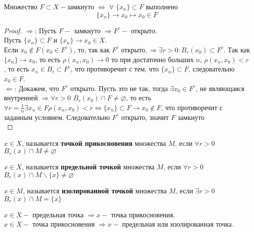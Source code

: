 \begin{claim}
	Множество $F \subset X - $замкнуто $\Leftrightarrow$ $\forall$ $\{x_n\} \subset F$ выполнено
	\[ \{x_n\} \to x_0 \mapsto x_0 \in F \]

	\begin{proof}
		$\Rightarrow$: 
		Пусть $F -$ замкнуто $\Rightarrow F^c -$ открыто. \\
		Пусть $\{ x_n \} \subset F$ и $\{ x_n \} \to x_0 \in X$. \\
		Если $x_0 \notin F (x_0 \in F^c)$, то, так как $F^c$ открыто$, \Rightarrow \exists r > 0 : B_r(x_0) \subset F^c$.
		Так как $\{ x_n \} \to x_0$, то есть $\rho(x_n, x_0) \to 0$ то при достаточно больших $n$, $\rho(x_n, x_0) < r$, то есть $x_n \in B_r \subset F^c$, что противоречит с тем, что $\{ x_n \} \subset F$, следовательно $x_0 \in F$. \\
		$\Leftarrow$:
		Докажем, что $F^c$ открыто. Пусть это не так, тогда $\exists x_0 \in F^c$, не являющаяся внутренней $\Rightarrow \forall r > 0$  $B_r(x_0) \cap F \neq \varnothing$, то есть $\forall r = \frac{1}{n} \exists x_n \in F \rho(x_n, x_0) < r \Leftrightarrow \{ x_n \} \subset F \to x_0 \notin F$, что противоречит с заданным условием. Следовательно $F^c$ открыто, значит $F$ замкнуто
\\
	\end{proof}
\end{claim}

\begin{definition}
	$x \in X$, называется \textbf{точкой прикосновения} множества $M$, если $\forall r > 0$ $B_r(x) \cap M \neq \varnothing$
\end{definition}

\begin{definition}
	$x \in X$, называется \textbf{предельной точкой} множества $M$, если $\forall r > 0$ $B_r(x) \cap M \backslash \{x\} \neq \varnothing$
\end{definition}

\begin{definition}
	$x \in M$, называется \textbf{изолированной точкой} множества $M$, если $\exists r > 0$ $B_r(x) \cap M  = \{ x \}$
\end{definition}

\begin{remark}
	$x \in X - $ предельная точка $\Rightarrow x -$ точка прикосновения. \\
	$x \in X - $ точка прикосновения $\Rightarrow x -$  предельная или изолированная точка.
\end{remark}

